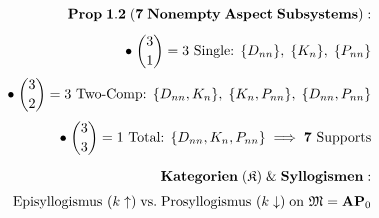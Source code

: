 \documentclass[preview]{standalone}
\begin{document}
\begin{align*}
\special{dvisvgm:raw <g id='unique000'>}\mathbf{Prop\;1.2\;(7\;Nonempty\;Aspect\;Subsystems):}\\[4pt]\bullet\;\binom{3}{1}=3\text{ Single: }\{D_{nn}\},\; \{K_n\},\; \{P_{nn}\}\\[3pt]\bullet\;\binom{3}{2}=3\text{ Two-Comp: }\{D_{nn},K_n\},\; \{K_n,P_{nn}\},\; \{D_{nn},P_{nn}\}\\[3pt]\bullet\;\binom{3}{3}=1\text{ Total: }\{D_{nn},K_n,P_{nn}\} \implies \mathbf{7\text{ Supports}}\\[6pt]\mathbf{Kategorien\;(\mathfrak{K})\;\&\;Syllogismen:}\\[3pt]\text{Episyllogismus }(k\uparrow)\;\text{vs.}\;\text{Prosyllogismus }(k\downarrow)\;\text{on }\mathfrak{M}=\mathbf{AP}_0\special{dvisvgm:raw </g>}
\end{align*}
\end{document}
